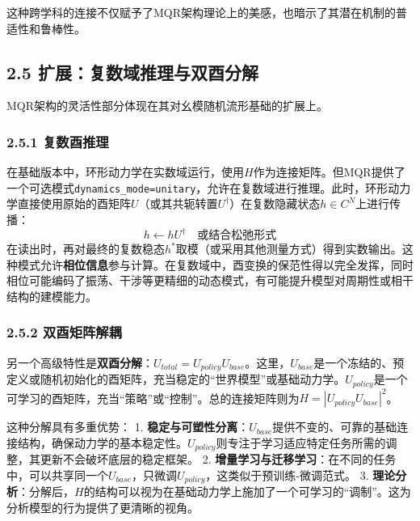 \documentclass[
  12pt,
]{article}
\begin{document}
这种跨学科的连接不仅赋予了MQR架构理论上的美感，也暗示了其潜在机制的普适性和鲁棒性。

\hypertarget{ux6269ux5c55ux590dux6570ux57dfux63a8ux7406ux4e0eux53ccux9149ux5206ux89e3}{%
\subsection{2.5
扩展：复数域推理与双酉分解}\label{ux6269ux5c55ux590dux6570ux57dfux63a8ux7406ux4e0eux53ccux9149ux5206ux89e3}}

MQR架构的灵活性部分体现在其对幺模随机流形基础的扩展上。

\hypertarget{ux590dux6570ux9149ux63a8ux7406}{%
\subsubsection{2.5.1 复数酉推理}\label{ux590dux6570ux9149ux63a8ux7406}}

在基础版本中，环形动力学在实数域运行，使用\(H\)作为连接矩阵。但MQR提供了一个可选模式\texttt{dynamics\_mode=unitary}，允许在复数域进行推理。此时，环形动力学直接使用原始的酉矩阵\(U\)（或其共轭转置\(U^\dagger\)）在复数隐藏状态\(h \in C^N\)上进行传播：
\[h \leftarrow h U^\dagger \quad \text{或结合松弛形式}\]
在读出时，再对最终的复数稳态\(h^*\)取模（或采用其他测量方式）得到实数输出。这种模式允许\textbf{相位信息}参与计算。在复数域中，酉变换的保范性得以完全发挥，同时相位可能编码了振荡、干涉等更精细的动态模式，有可能提升模型对周期性或相干结构的建模能力。

\hypertarget{ux53ccux9149ux77e9ux9635ux89e3ux8026}{%
\subsubsection{2.5.2
双酉矩阵解耦}\label{ux53ccux9149ux77e9ux9635ux89e3ux8026}}

另一个高级特性是\textbf{双酉分解}：\(U_{total} = U_{policy} U_{base}\)。这里，\(U_{base}\)是一个冻结的、预定义或随机初始化的酉矩阵，充当稳定的``世界模型''或基础动力学。\(U_{policy}\)是一个可学习的酉矩阵，充当``策略''或``控制''。总的连接矩阵则为\(H = |U_{policy} U_{base}|^2\)。

这种分解具有多重优势： 1.
\textbf{稳定与可塑性分离}：\(U_{base}\)提供不变的、可靠的基础连接结构，确保动力学的基本稳定性。\(U_{policy}\)则专注于学习适应特定任务所需的调整，其更新不会破坏底层的稳定框架。
2.
\textbf{增量学习与迁移学习}：在不同的任务中，可以共享同一个\(U_{base}\)，只微调\(U_{policy}\)，这类似于预训练-微调范式。
3.
\textbf{理论分析}：分解后，\(H\)的结构可以视为在基础动力学上施加了一个可学习的``调制''。这为分析模型的行为提供了更清晰的视角。
\end{document}
